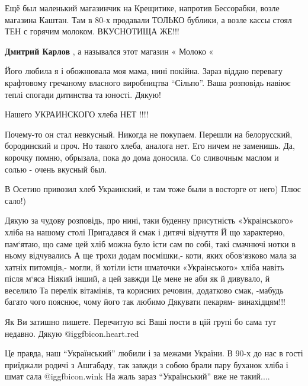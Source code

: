 \begin{itemize}

Ещё был маленький магазинчик на Крещитике, напротив Бессорабки, возле магазина
Каштан. Там в 80-х продавали ТОЛЬКО бублики, а возле кассы стоял ТЕН с горячим
молоком. ВКУСНОТИЩА ЖЕ!!!

\begin{itemize} %
\textbf{Дмитрий Карлов} , а назывался этот магазин « Молоко «
\end{itemize} %


Його любила я і обожнювала моя мама, нині покійна. Зараз віддаю перевагу
крафтовому гречаному власного виробництва \enquote{Сільпо}.  Ваша розповідь навіює
теплі спогади дитинства та юності. Дякую!

Нашего УКРАИНСКОГО хлеба НЕТ !!!!


Почему-то он стал невкусный. Никогда не покупаем. Перешли на белорусский, 
бородинский и проч. Но такого хлеба, аналога нет. Его ничем не заменишь. Да,
корочку помню, обрызала, пока до дома доносила. Со сливочным маслом и солью -
очень вкусный был.


В Осетию привозил хлеб Украинский, и там тоже были в восторге от него) Плюс
сало!)

Дякую за чудову розповідь, про нині, таки буденну присутність «Украінського» хліба на нашому столі
Пригадався й смак і дитячі відчуття
Й що характерно, пам‘ятаю, що саме цей хліб можна було істи сам по собі, такі смачнючі нотки в ньому відчувались
А ще трохи додам посмішки,- коти, яких обов‘язково мала за хатніх питомців,- могли, й хотіли істи шматочки «Украінського» хліба навіть після м‘яса
Ніякий інший, а цей завжди
Це мене не аби як й дивувало, й веселило
Та перелік вітамінів, та корисних речовин, додатково смак, -мабудь багато чого пояснює, чому його так любимо
Дякувати пекарям- винахідцям!!!


Як Ви затишно пишете. Перечитую всі Ваші пости в цій групі бо сама тут недавно.
Дякую @igg{fbicon.heart.red}


Це правда, наш \enquote{Український} любили і за межами України. В 90-х до нас в гості
приїджали родичі з Ашгабаду, так завжди з собою брали пару буханок хліба і шмат
сала @igg{fbicon.wink}  На жаль зараз \enquote{Український} вже не такий....


\end{itemize}

